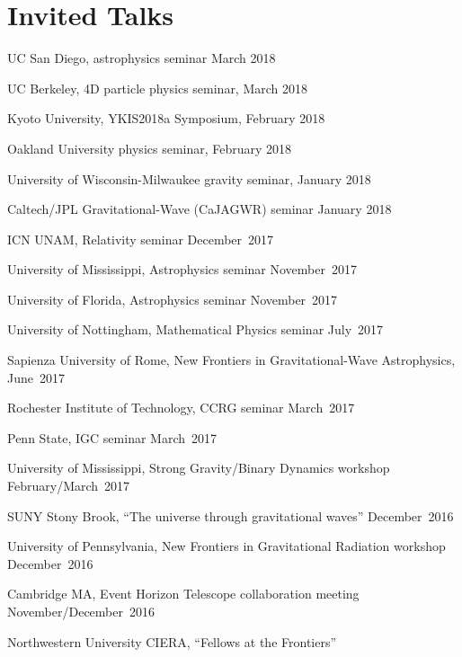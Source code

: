 \newcommand{\playsymbol}{$\blacktriangleright$}
\section{\sc Invited Talks}
\begin{etaremune}
\item
  UC San Diego, astrophysics seminar
  \hfill{}
  March 2018
\item
  UC Berkeley, 4D particle physics seminar,
  \hfill{}
  March 2018
\item
  Kyoto University, YKIS2018a Symposium,
  \hfill{}
  February 2018
\item
  Oakland University physics seminar,
  \hfill{}
  February 2018
\item
  University of Wisconsin-Milwaukee gravity seminar,
  \hfill{}
  January 2018
\item
  Caltech/JPL Gravitational-Wave (CaJAGWR) seminar
  \hfill{}
  January 2018
\item
  ICN UNAM,
  Relativity seminar
  \hfill{}
  December~2017
\item
  University of Mississippi,
  Astrophysics seminar
  \hfill{}
  November~2017
\item
  University of Florida,
  Astrophysics seminar
  \hfill{}
  November~2017
\item
  University of Nottingham,
  Mathematical Physics seminar
  \hfill{}
  July~2017
\item
  Sapienza University of Rome,
  New Frontiers in Gravitational-Wave Astrophysics,
  \hfill{}
  June~2017
\item
  Rochester Institute of Technology,
  CCRG seminar
  \hfill{}
  March~2017
\item
  Penn State,
  IGC seminar
  \hfill{}
  March~2017
\item
  University of Mississippi,
  Strong Gravity/Binary Dynamics workshop
  \hfill{}
  February/March~2017
\item
  SUNY Stony Brook,
  ``The universe through gravitational waves''
  \hfill{}
  December~2016
\item
  University of Pennsylvania,
  New Frontiers in Gravitational Radiation workshop
  \hfill{}
  December~2016
\item
  Cambridge MA,
  Event Horizon Telescope collaboration meeting
  \hfill{}
  November/December~2016
\item
  Northwestern University CIERA,
  ``Fellows at the Frontiers''

\end{etaremune}
